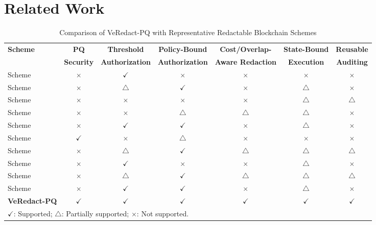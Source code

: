 \documentclass[lettersize,journal]{IEEEtran}
\begin{document}
\section{Related Work}
   \begin{table}[t]
\centering
\caption{Comparison of VeRedact-PQ with Representative Redactable
Blockchain Schemes}
\label{tab:comparison}
\renewcommand{\arraystretch}{1.15}
\setlength{\tabcolsep}{4.0pt}
\begin{tabular}{lcccccc}
\hline
\textbf{Scheme} &
\textbf{PQ} &
\textbf{Threshold} &
\textbf{Policy-Bound} &
\textbf{Cost/Overlap-} &
\textbf{State-Bound} &
\textbf{Reusable} \\
&
\textbf{Security} &
\textbf{Authorization} &
\textbf{Authorization} &
\textbf{Aware Redaction} &
\textbf{Execution} &
\textbf{Auditing} \\
\hline

Scheme~\cite{ref1}
& $\times$ & $\checkmark$ & $\times$ & $\times$
& $\times$ & $\times$ \\

Scheme~\cite{ref5}
& $\times$ & $\triangle$ & $\checkmark$ & $\times$
& $\triangle$ & $\times$ \\

Scheme~\cite{ref13}
& $\times$ & $\times$ & $\times$ & $\times$
& $\triangle$ & $\triangle$ \\

Scheme~\cite{ref14}
& $\times$ & $\times$ & $\triangle$ & $\triangle$
& $\triangle$ & $\times$ \\

Scheme~\cite{ref15}
& $\times$ & $\checkmark$ & $\checkmark$ & $\times$
& $\triangle$ & $\times$ \\

Scheme~\cite{ref17}
& $\checkmark$ & $\times$ & $\triangle$ & $\times$
& $\times$ & $\times$ \\

Scheme~\cite{ref20}
& $\times$ & $\triangle$ & $\checkmark$ & $\triangle$
& $\triangle$ & $\triangle$ \\

Scheme~\cite{ref27}
& $\times$ & $\checkmark$ & $\times$ & $\times$
& $\triangle$ & $\times$ \\

Scheme~\cite{ref33}
& $\times$ & $\triangle$ & $\checkmark$ & $\triangle$
& $\triangle$ & $\triangle$ \\

Scheme~\cite{ref34}
& $\times$ & $\checkmark$ & $\checkmark$ & $\times$
& $\triangle$ & $\times$ \\

\hline
\textbf{VeRedact-PQ}
& $\checkmark$ & $\checkmark$ & $\checkmark$
& $\checkmark$ & $\checkmark$ & $\checkmark$ \\
\hline

\multicolumn{7}{l}{
\footnotesize $\checkmark$: Supported;
$\triangle$: Partially supported;
$\times$: Not supported.}
\end{tabular}
\end{table}
\end{document}
